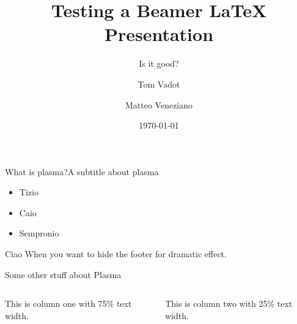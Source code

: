 \documentclass[11pt]{beamer}
\title{Testing a Beamer \LaTeX{} Presentation}
\subtitle{Is it good?}
\author[Tom Vadot \and Matteo Veneziano]{Tom Vadot \and Matteo Veneziano}
\institute[]{EPFL Section of Physics}
\date{\today}
\begin{document}
\begin{frame}
    \titlepage
\end{frame}

\begin{frame}{What is plasma?}{A subtitle about plasma}
    \begin{itemize}
    \item Tizio
    \item Caio
    \item Sempronio
    \end{itemize}
\end{frame}

\begin{frame}[plain]{Ciao}
When you want to hide the footer for dramatic effect.
\end{frame}


\begin{frame}{Some other stuff about Plasma}
    \begin{columns}[T]
        \centering
        This is column one with 75\% text width.

        \centering
        This is column two with 25\% text width.
    \end{columns}
\end{frame}
\end{document}
